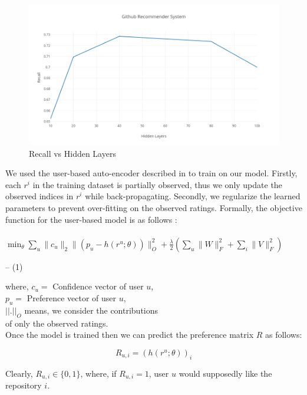 \documentclass[conference]{IEEEtran}
\begin{document}
\begin{figure}[t]
    \centering
    \captionsetup{justification=centering}
    \includegraphics[width=\linewidth]{GRS.png}
    \caption{Recall vs Hidden Layers}
    \label{fig:1}
\end{figure}
We used the user-based auto-encoder described in \cite{paper1} to train on our model. Firstly, each $r^{i}$ in the training dataset is partially observed, thus we only update the observed indices in $r^{i}$ while back-propagating. Secondly, we regularize the learned parameters to prevent over-fitting on the observed ratings. Formally, the objective function for the user-based model is as follows :\\\\
\resizebox{.5 \textwidth}{!} {$ \min_{\theta}\sum_{u} \|c_{u}\|_2 \|\left(p_{u} - h(r^{u};\theta)\right)\|_O^2 + \frac{\lambda}{2} \left(\sum_u \|W\|_F^2 + \sum_i \|V\|_F^2\right) $}
\begin{flushright}
-- (1)
\end{flushright}
\hspace{0.3in}where, $c_u = $ Confidence vector of user $u$, \\
      \hspace*{0.9in}$p_u = $ Preference vector of user $u$,\\
      \hspace*{0.9in}$||.||_O$ means, we consider the contributions\\ 
      \hspace*{1.2in}of only the observed ratings.\\
Once the model is trained then we can predict the preference matrix $R$ as follows:

    \[ R_{u,i} = \left(h(r^{u};\theta)\right)_{i} \]

Clearly, $R_{u,i} \in \{0, 1\}$, where, if $R_{u,i} = 1$, user $u$ would supposedly like the repository $i$.
\end{document}
